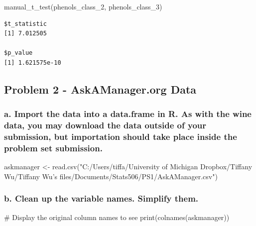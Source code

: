 \documentclass[
  letterpaper,
  DIV=11,
  numbers=noendperiod]{scrartcl}
\newenvironment{Shaded}{\begin{snugshade}}{\end{snugshade}}
\newcommand{\CommentTok}[1]{\textcolor[rgb]{0.37,0.37,0.37}{#1}}
\newcommand{\FunctionTok}[1]{\textcolor[rgb]{0.28,0.35,0.67}{#1}}
\newcommand{\NormalTok}[1]{\textcolor[rgb]{0.00,0.23,0.31}{#1}}
\newcommand{\OtherTok}[1]{\textcolor[rgb]{0.00,0.23,0.31}{#1}}
\newcommand{\StringTok}[1]{\textcolor[rgb]{0.13,0.47,0.30}{#1}}
\begin{document}
\begin{Shaded}
\begin{Highlighting}[]
\FunctionTok{manual\_t\_test}\NormalTok{(phenols\_class\_2, phenols\_class\_3)}
\end{Highlighting}
\end{Shaded}

\begin{verbatim}
$t_statistic
[1] 7.012505

$p_value
[1] 1.621575e-10
\end{verbatim}

\subsection{Problem 2 - AskAManager.org
Data}\label{problem-2---askamanager.org-data}

\subsubsection{a. Import the data into a data.frame in R. As with the
wine data, you may download the data outside of your submission, but
importation should take place inside the problem set
submission.}\label{a.-import-the-data-into-a-data.frame-in-r.-as-with-the-wine-data-you-may-download-the-data-outside-of-your-submission-but-importation-should-take-place-inside-the-problem-set-submission.}

\begin{Shaded}
\begin{Highlighting}[]
\NormalTok{askmanager }\OtherTok{\textless{}{-}} \FunctionTok{read.csv}\NormalTok{(}\StringTok{"C:/Users/tiffa/University of Michigan Dropbox/Tiffany Wu/Tiffany Wu’s files/Documents/Stats506/PS1/AskAManager.csv"}\NormalTok{)}
\end{Highlighting}
\end{Shaded}

\subsubsection{b. Clean up the variable names. Simplify
them.}\label{b.-clean-up-the-variable-names.-simplify-them.}

\begin{Shaded}
\begin{Highlighting}[]
\CommentTok{\# Display the original column names to see}
\FunctionTok{print}\NormalTok{(}\FunctionTok{colnames}\NormalTok{(askmanager))}
\end{Highlighting}
\end{Shaded}
\end{document}
